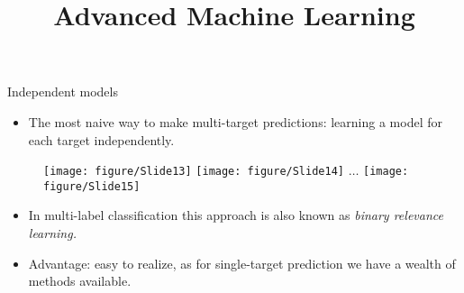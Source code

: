 \documentclass[11pt,compress,t,notes=noshow, xcolor=table]{beamer}
\title{Advanced Machine Learning}
\date{}
\begin{document}



\sloppy


\begin{frame}{Independent models}
	\begin{itemize}
		\item 	The most naive way to make multi-target predictions: learning a model for each target independently.

	\end{itemize}

	\begin{figure}
		\centering
		\texttt{[image: figure/Slide13]}
		\texttt{[image: figure/Slide14]} 		
		$\ldots$		
		\texttt{[image: figure/Slide15]}
	\end{figure}

	\begin{itemize}
		\item In multi-label classification this approach is also known as \emph{binary relevance learning.}

		\item Advantage: easy to realize, as for single-target prediction we have a wealth of methods available.

	\end{itemize}

\end{frame}
\end{document}

